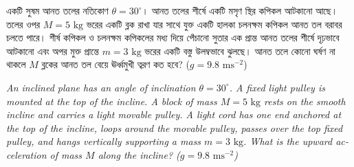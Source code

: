\documentclass[12pt, a4paper]{article}
\begin{document}
\newpage

\begin{tcolorbox}[questionbox={প্রশ্ন (Question) 46}]
    \noindent
    একটি সুষম আনত তলের নতিকোণ $\theta = 30^\circ$। আনত তলের শীর্ষে একটি মসৃণ স্থির কপিকল আটকানো আছে। তলের ওপর $M = 5\text{ kg}$ ভরের একটি ব্লক রাখা যার সাথে যুক্ত একটি হালকা চলনক্ষম কপিকল আনত তল বরাবর চলতে পারে। শীর্ষ কপিকল ও চলনক্ষম কপিকলের মধ্য দিয়ে পেঁচানো সুতার এক প্রান্ত আনত তলের শীর্ষে দৃঢ়ভাবে আটকানো এবং অপর মুক্ত প্রান্তে $m = 3\text{ kg}$ ভরের একটি বস্তু উলম্বভাবে ঝুলছে। আনত তলে কোনো ঘর্ষণ না থাকলে $M$ ব্লকের আনত তল বেয়ে ঊর্ধ্বমুখী ত্বরণ কত হবে? ($g = 9.8\text{ ms}^{-2}$)
    
    \vspace{0.8em}
    \begin{english}
    \noindent\textit{\color{darkgray}
    An inclined plane has an angle of inclination $\theta = 30^\circ$. A fixed light pulley is mounted at the top of the incline. A block of mass $M = 5\text{ kg}$ rests on the smooth incline and carries a light movable pulley. A light cord has one end anchored at the top of the incline, loops around the movable pulley, passes over the top fixed pulley, and hangs vertically supporting a mass $m = 3\text{ kg}$. What is the upward acceleration of mass $M$ along the incline? ($g = 9.8\text{ ms}^{-2}$)
    }
    \end{english}
\end{tcolorbox}
\end{document}
